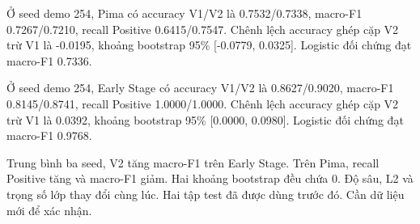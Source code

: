Ở seed demo 254, Pima có accuracy V1/V2 là 0.7532/0.7338, macro-F1 0.7267/0.7210, recall Positive 0.6415/0.7547. Chênh lệch accuracy ghép cặp V2 trừ V1 là -0.0195, khoảng bootstrap 95\% [-0.0779, 0.0325]. Logistic đối chứng đạt macro-F1 0.7336.

Ở seed demo 254, Early Stage có accuracy V1/V2 là 0.8627/0.9020, macro-F1 0.8145/0.8741, recall Positive 1.0000/1.0000. Chênh lệch accuracy ghép cặp V2 trừ V1 là 0.0392, khoảng bootstrap 95\% [0.0000, 0.0980]. Logistic đối chứng đạt macro-F1 0.9768.

Trung bình ba seed, V2 tăng macro-F1 trên Early Stage. Trên Pima, recall Positive tăng và macro-F1 giảm. Hai khoảng bootstrap đều chứa 0. Độ sâu, L2 và trọng số lớp thay đổi cùng lúc. Hai tập test đã được dùng trước đó. Cần dữ liệu mới để xác nhận.

